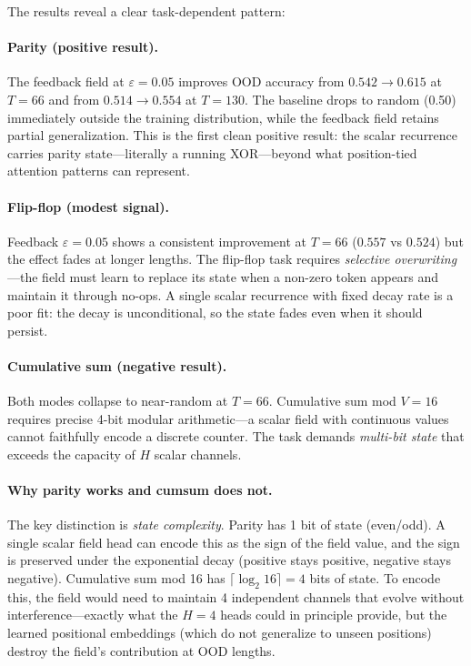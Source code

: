 \documentclass[11pt,a4paper]{article}
\newcommand{\evap}{\varepsilon}
\begin{document}
The results reveal a clear task-dependent pattern:

\paragraph{Parity (positive result).}
The feedback field at $\evap = 0.05$ improves OOD accuracy from
$0.542 \to 0.615$ at $T = 66$ and from $0.514 \to 0.554$ at
$T = 130$. The baseline drops to random (0.50) immediately outside
the training distribution, while the feedback field retains partial
generalization. This is the first clean positive result: the scalar
recurrence carries parity state---literally a running XOR---beyond
what position-tied attention patterns can represent.

\paragraph{Flip-flop (modest signal).}
Feedback $\evap = 0.05$ shows a consistent improvement at $T = 66$
($0.557$ vs $0.524$) but the effect fades at longer lengths. The
flip-flop task requires \emph{selective overwriting}---the field must
learn to replace its state when a non-zero token appears and maintain
it through no-ops. A single scalar recurrence with fixed decay rate
is a poor fit: the decay is unconditional, so the state fades even
when it should persist.

\paragraph{Cumulative sum (negative result).}
Both modes collapse to near-random at $T = 66$. Cumulative sum mod
$V = 16$ requires precise 4-bit modular arithmetic---a scalar field
with continuous values cannot faithfully encode a discrete counter.
The task demands \emph{multi-bit state} that exceeds the capacity of
$H$ scalar channels.

\paragraph{Why parity works and cumsum does not.}
The key distinction is \emph{state complexity}. Parity has 1 bit of
state (even/odd). A single scalar field head can encode this as the
sign of the field value, and the sign is preserved under the
exponential decay (positive stays positive, negative stays negative).
Cumulative sum mod 16 has $\lceil \log_2 16 \rceil = 4$ bits of
state. To encode this, the field would need to maintain 4 independent
channels that evolve without interference---exactly what the $H = 4$
heads could in principle provide, but the learned positional embeddings
(which do not generalize to unseen positions) destroy the field's
contribution at OOD lengths.
\end{document}
